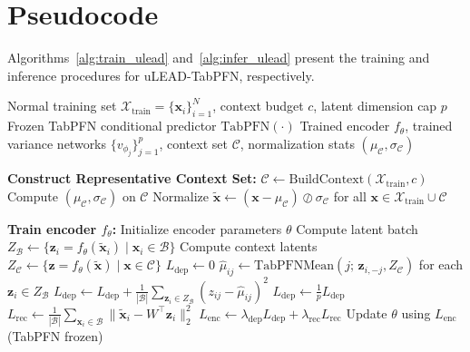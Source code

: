 \documentclass[conference]{IEEEtran}
\begin{document}
	\section{Pseudocode}
	\label{app:pseudocode}

	Algorithms~\ref{alg:train_ulead} and~\ref{alg:infer_ulead} present the training and inference procedures for uLEAD-TabPFN, respectively.

	\begin{algorithm}[t]
		\caption{Training uLEAD-TabPFN}
		\label{alg:train_ulead}
		\begin{algorithmic}[1]
			\Require Normal training set $\mathcal{X}_{\mathrm{train}}=\{\mathbf{x}_i\}_{i=1}^N$, context budget $c$, latent dimension cap $p$
			\Require Frozen TabPFN conditional predictor $\mathrm{TabPFN}(\cdot)$
			\Ensure Trained encoder $f_\theta$, trained variance networks $\{v_{\phi_j}\}_{j=1}^p$, context set $\mathcal{C}$, normalization stats $(\mu_{\mathcal{C}},\sigma_{\mathcal{C}})$

			\vspace{2pt}
			\State \textbf{Construct Representative Context Set:}
			\State $\mathcal{C} \gets \mathrm{BuildContext}(\mathcal{X}_{\mathrm{train}}, c)$ 
			\State Compute $(\mu_{\mathcal{C}},\sigma_{\mathcal{C}})$ on $\mathcal{C}$
			\State Normalize $\tilde{\mathbf{x}}\gets (\mathbf{x}-\mu_{\mathcal{C}})\oslash\sigma_{\mathcal{C}}$ for all $\mathbf{x}\in\mathcal{X}_{\mathrm{train}} \cup \mathcal{C}$

			\vspace{2pt}
			\State \textbf{Train encoder $f_\theta$:}
			\State Initialize encoder parameters $\theta$ 
			\State Compute latent batch $Z_{\mathcal{B}} \gets \{\mathbf{z}_i=f_\theta(\tilde{\mathbf{x}}_i)\mid \mathbf{x}_i\in \mathcal{B}\}$
			\State Compute context latents $Z_{\mathcal{C}} \gets \{\mathbf{z}=f_\theta(\tilde{\mathbf{x}})\mid \mathbf{x}\in\mathcal{C}\}$
			\State $L_{\mathrm{dep}}\gets 0$
			\State $\hat{\mu}_{ij} \gets \mathrm{TabPFNMean}(j;\, \mathbf{z}_{i,-j}, Z_{\mathcal{C}})$ for each $\mathbf{z}_i\in Z_{\mathcal{B}}$
			\State $L_{\mathrm{dep}} \gets L_{\mathrm{dep}} + \frac{1}{|\mathcal{B}|}\sum_{\mathbf{z}_i\in Z_{\mathcal{B}}}(z_{ij}-\hat{\mu}_{ij})^2$
			\EndFor
			\State $L_{\mathrm{dep}}\gets \frac{1}{p}L_{\mathrm{dep}}$
			\State $L_{\mathrm{rec}} \gets \frac{1}{|\mathcal{B}|}\sum_{\mathbf{x}_i\in\mathcal{B}} \|\tilde{\mathbf{x}}_i - W^\top \mathbf{z}_i\|_2^2$ 
			\State $L_{\mathrm{enc}} \gets \lambda_{\mathrm{dep}}L_{\mathrm{dep}}+\lambda_{\mathrm{rec}}L_{\mathrm{rec}}$
			\State Update $\theta$ using $L_{\mathrm{enc}}$ (TabPFN frozen)
			\EndFor
			\EndFor


\end{algorithmic}
\end{algorithm}
\end{document}
